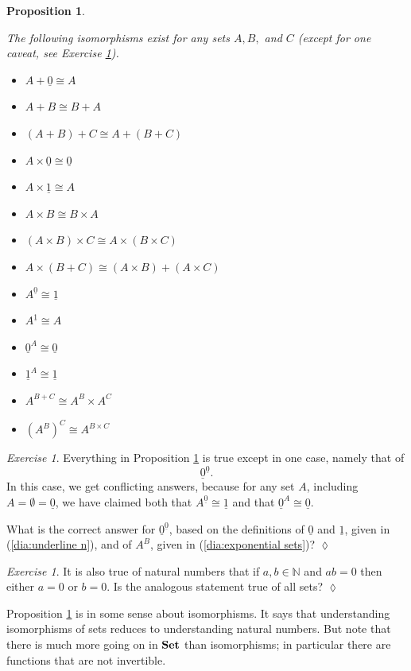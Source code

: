 \documentclass{book}
\def\NN{{\mathbb N}}
\def\iso{\cong}
\def\ul{\underline}
\def\Set{{\bf Set}}
\newtheorem{proposition}[subsubsection]{Proposition}
\theoremstyle{remark}
\newtheorem{exc}[subsubsection]{Exercise}
\newenvironment{exercise}{\begin{exc}}{\hspace*{\fill}$\lozenge$\end{exc}}
\theoremstyle{definition}
\begin{document}
\begin{proposition}\label{prop:arithmetic of sets}

The following isomorphisms exist for any sets $A,B,$ and $C$ (except for one caveat, see Exercise \ref{exc:0 to the 0}). 
\begin{itemize}
\item $A+\ul{0}\iso A$
\item $A + B\iso B + A$
\item $(A + B) + C \iso A + (B + C)$
\item $A\times\ul{0}\iso\ul{0}$
\item $A\times\ul{1}\iso A$
\item $A\times B\iso B\times A$
\item $(A\times B)\times C \iso A\times (B\times C)$
\item $A\times(B+C)\iso (A\times B)+(A\times C)$
\item $A^{\ul{0}}\iso \ul{1}$
\item $A^{\ul{1}}\iso A$
\item $\ul{0}^A\iso\ul{0}$
\item $\ul{1}^A\iso\ul{1}$
\item $A^{B+C}\iso A^B\times A^C$
\item $(A^B)^C\iso A^{B\times C}$
\end{itemize}

\end{proposition}

\begin{exercise}\label{exc:0 to the 0}
Everything in Proposition \ref{prop:arithmetic of sets} is true except in one case, namely that of $$\ul{0}^{\ul{0}}.$$ In this case, we get conflicting answers, because for any set $A$, including $A=\emptyset=\ul{0}$, we have claimed both that $A^{\ul{0}}\iso\ul{1}$ and that $\ul{0}^A\iso\ul{0}.$ 

What is the correct answer for $\ul{0}^{\ul{0}}$, based on the definitions of $\ul{0}$ and $\ul{1}$, given in (\ref{dia:underline n}), and of $A^B$, given in (\ref{dia:exponential sets})?
\end{exercise}

\begin{exercise}
It is also true of natural numbers that if $a,b\in\NN$ and $ab=0$ then either $a=0$ or $b=0$. Is the analogous statement true of all sets?
\end{exercise}

Proposition \ref{prop:arithmetic of sets} is in some sense about isomorphisms. It says that understanding isomorphisms of sets reduces to understanding natural numbers. But note that there is much more going on in $\Set$ than isomorphisms; in particular there are functions that are not invertible. 
\end{document}

